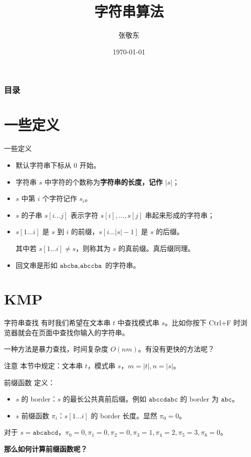 \documentclass[table]{beamer}
\title{字符串算法}
\author{张敬东}
\institute{福州第十六中学}
\date{\today}
\begin{document}
\frame{\titlepage} %

\begin{frame} %
	\frametitle{目录}

	\tableofcontents

\end{frame}

\section{一些定义}

\begin{frame}{一些定义}
	\begin{itemize}
		\item 默认字符串下标从 $0$ 开始。
		\pause
		\item 字符串 $s$ 中字符的个数称为\textbf{字符串的长度，记作 $|s|$}；
		\pause
		\item $s$ 中第 $i$ 个字符记作 $s_i$。
		\pause
		\item $s$ 的子串 $s[i\dots j]$ 表示字符 $s[i],\dots,s[j]$ 串起来形成的字符串；
		\pause
		\item $s[1\dots i]$ 是 $s$ 到 $i$ 的前缀，$s[i\dots |s|-1]$ 是 $s$ 的后缀。
		
		其中若 $s[1\dots i]\ne s$，则称其为 $s$ 的真前缀。真后缀同理。
		\pause
		\item 回文串是形如 $\texttt{abcba},\texttt{abccba}$ 的字符串。
	\end{itemize}
\end{frame}

\section{KMP}

\begin{frame}{字符串查找}
	有时我们希望在文本串 $t$ 中查找模式串 $s$。比如你按下 Ctrl+F 时浏览器就会在页面中查找你输入的字符串。
	\pause
	
	一种方法是暴力查找，时间复杂度 $O(nm)$。有没有更快的方法呢？
	\pause

	\begin{block}{注意}
		本节中规定：文本串 $t$，模式串 $s$，$m=|t|,n=|s|$。
	\end{block}
\end{frame}

\begin{frame}{前缀函数}
	定义：
	\begin{itemize}
		\item $s$ 的 border：$s$ 的最长公共真前后缀。例如 $\texttt{abccdabc}$ 的 border 为 $\texttt{abc}$。
		\item $s$ 前缀函数 $\pi_i$：$s[1\dots i]$ 的 border 长度。显然 $\pi_0=0$。
	\end{itemize}
	\pause

	对于 $s=\texttt{abcabcd}$，$\pi_0=0,\pi_1=0,\pi_2=0,\pi_3=1,\pi_4=2,\pi_5=3,\pi_6=0$。
	\pause

	\textbf{那么如何计算前缀函数呢？}
\end{frame}
\end{document}

